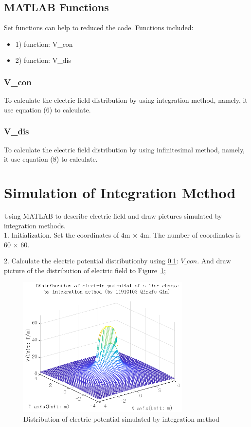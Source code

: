 \documentclass[10pt, journal, final]{IEEEtran}
\begin{document}
\subsection{
    MATLAB Functions
}
\label{func}
Set functions can help to reduced the code.
Functions included:
\begin{itemize}
    \item 1) function: V\_con
    \item 2) function: V\_dis
\end{itemize}

\subsubsection*{
    V\_con
}
\label{V_con}
To calculate the electric field distribution
by using integration method, namely, it use equation (6) to calculate.


\subsubsection*{
    V\_dis
}
\label{V_dis}
To calculate the electric field distribution
by using infinitesimal method, namely, it use equation (8) to calculate.


\section{
  Simulation of Integration Method
 }
\label{sec:inte}
Using MATLAB to describe electric field and draw pictures
simulated by integration methods.\\
1. Initialization. Set the coordinates of 4m $\times$ 4m.
The number of coordinates is 60 $\times$ 60.

\label{work1.1}

2. Calculate the electric potential distributionby using \ref{func}: $V\_con$.
And draw picture of the distribution of electric field to Figure~\ref{fig:1.1};

\label{work1.2}

\begin{figure}[htbp]
    \centering
    \includegraphics[width = 3.4in]{figures/fig1.1.eps}
    \caption{Distribution of electric potential simulated by integration method}
    \label{fig:1.1}
\end{figure}
\end{document}
